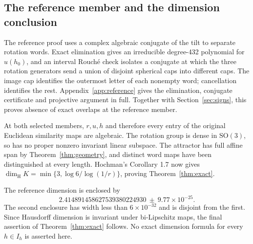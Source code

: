 \documentclass[11pt,a4paper]{article}
\theoremstyle{definition}\newtheorem{definition}[theorem]{Definition}
\theoremstyle{remark}\newtheorem{remark}[theorem]{Remark}
\newcommand{\dimH}{\dim_{\mathrm H}}\newcommand{\dimA}{\dim_{\mathrm A}}
\newcommand{\SO}{\mathrm{SO}}\newcommand{\lk}{\operatorname{lk}}
\begin{document}
\subsection{The reference member and the dimension conclusion}
The reference proof uses a complex algebraic conjugate of the tilt to
separate rotation words. Exact elimination gives an irreducible degree-432
polynomial for $u(h_0)$, and an interval Rouch\'e check isolates a conjugate
at which the three rotation generators send a union of disjoint spherical
caps into different caps. The image cap identifies the outermost letter
of each nonempty word; cancellation identifies the rest.
Appendix~\ref{app:reference} gives the elimination, conjugate certificate
and projective argument in full. Together with Section~\ref{sec:signs},
this proves absence of exact overlaps at the reference member.

At both selected members, $r,u,h$ and therefore every entry of the original
Euclidean similarity maps are algebraic. The rotation group is dense in
$\SO(3)$, so has no proper nonzero invariant linear subspace. The attractor
has full affine span by Theorem~\ref{thm:geometry}, and distinct word maps
have been distinguished at every length. Hochman's Corollary 1.7 now gives
$\dimH K=\min\{3,\log6/\log(1/r)\}$, proving Theorem~\ref{thm:exact}.

The reference dimension is enclosed by
\[
2.414891458627539380224930\ \mathbin{\pm}\ 9.77\times10^{-25}.
\]
The second enclosure has width less than
$6\times10^{-32}$ and is disjoint from the first. Since Hausdorff dimension
is invariant under bi-Lipschitz maps, the final assertion of
Theorem~\ref{thm:exact} follows. No exact dimension formula for every $h\in I_h$
is asserted here.



\appendix




\end{document}
